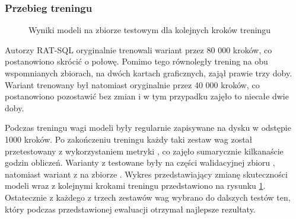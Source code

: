 \subsubsection{Przebieg treningu}

\begin{figure}[ht]
  \begin{center}
    \caption{Wyniki modeli na zbiorze testowym dla kolejnych kroków treningu}
    \label{plot:ratsql-accuracy}
  \end{center}
\end{figure}

Autorzy {RAT-SQL} oryginalnie trenowali wariant  przez 80 000 kroków, co postanowiono skrócić o połowę. Pomimo tego równoległy trening na obu wspomnianych zbiorach, na dwóch kartach graficznych, zajął prawie trzy doby. Wariant  trenowany był natomiast oryginalnie przez 40 000 kroków, co postanowiono pozostawić bez zmian i w tym przypadku zajęło to niecałe dwie doby. 

Podczas treningu wagi modeli były regularnie zapisywane na dysku w odstępie 1000 kroków. Po zakończeniu treningu każdy taki zestaw wag został przetestowany z wykorzystaniem metryki , co zajęło sumarycznie kilkanaście godzin obliczeń. Warianty z  testowane były na części walidacyjnej zbioru , natomiast wariant z  na zbiorze . Wykres przedstawiający zmianę skuteczności modeli wraz z kolejnymi krokami treningu przedstawiono na rysunku \ref{plot:ratsql-accuracy}. Ostatecznie z każdego z trzech zestawów wag wybrano do dalszych testów ten, który podczas przedstawionej ewaluacji otrzymał najlepsze rezultaty. 

